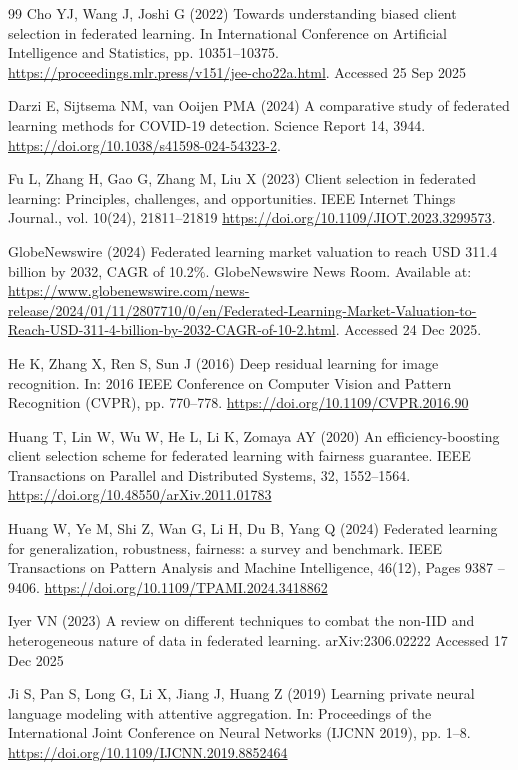 \documentclass[pdflatex,sn-mathphys-num,oneside]{sn-jnl}%
\theoremstyle{thmstyleone}%
\theoremstyle{thmstyletwo}%
\theoremstyle{thmstylethree}%
\begin{document}
\begin{thebibliography}{99}
Cho YJ, Wang J, Joshi G (2022) Towards understanding biased client selection in federated learning. In International Conference on Artificial Intelligence and Statistics, pp. 10351–10375. \url{https://proceedings.mlr.press/v151/jee-cho22a.html}. Accessed 25 Sep 2025

Darzi E, Sijtsema NM, van Ooijen PMA (2024) A comparative study of federated learning methods for COVID-19 detection. Science Report 14, 3944. \url{https://doi.org/10.1038/s41598-024-54323-2}.

Fu L, Zhang H, Gao G, Zhang M, Liu X (2023) Client selection in federated learning: Principles, challenges, and opportunities. IEEE Internet Things Journal., vol. 10(24), 21811–21819 \url{https://doi.org/10.1109/JIOT.2023.3299573}.


GlobeNewswire (2024) Federated learning market valuation to reach USD 311.4 billion by 2032, CAGR of 10.2\%. GlobeNewswire News Room. Available at: \url{https://www.globenewswire.com/news-release/2024/01/11/2807710/0/en/Federated-Learning-Market-Valuation-to-Reach-USD-311-4-billion-by-2032-CAGR-of-10-2.html}. Accessed 24 Dec 2025.


He K, Zhang X, Ren S, Sun J (2016) Deep residual learning for image recognition. In: 2016 IEEE Conference on Computer Vision and Pattern Recognition (CVPR), pp. 770–778. \url{https://doi.org/10.1109/CVPR.2016.90}

Huang T, Lin W, Wu W, He L, Li K, Zomaya AY (2020) An efficiency-boosting client selection scheme for federated learning with fairness guarantee. IEEE Transactions on Parallel and Distributed Systems, 32, 1552–1564. \url{https://doi.org/10.48550/arXiv.2011.01783}

Huang W, Ye M, Shi Z, Wan G, Li H, Du B, Yang Q (2024) Federated learning for generalization, robustness, fairness: a survey and benchmark. IEEE Transactions on Pattern Analysis and Machine Intelligence, 46(12), Pages 9387 – 9406. \url{https://doi.org/10.1109/TPAMI.2024.3418862}

Iyer VN (2023) A review on different techniques to combat the non-IID and heterogeneous nature of data in federated learning. arXiv:2306.02222 Accessed 17 Dec 2025

Ji S, Pan S, Long G, Li X, Jiang J, Huang Z (2019) Learning private neural language modeling with attentive aggregation. In: Proceedings of the International Joint Conference on Neural Networks (IJCNN 2019), pp. 1–8. \url{https://doi.org/10.1109/IJCNN.2019.8852464}


\end{thebibliography}
\end{document}
